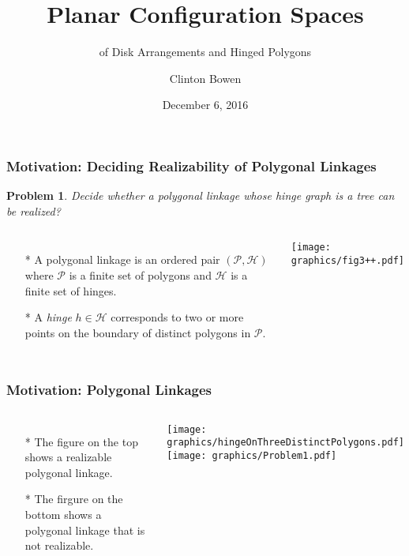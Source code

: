 \documentclass{beamer}
\title[Planar Configuration Spaces]{Planar Configuration Spaces }
\subtitle{of Disk Arrangements and Hinged Polygons}
\author{Clinton Bowen}
\institute
{
  Cal State Northridge
}
\date
{December 6, 2016}
\newtheorem{prob}{Problem}
\newcommand{\HH}{{\mathcal{H}}} %
\renewcommand{\PP}{{\mathcal{P}}} %
\begin{document}
\frame{\titlepage}
\begin{frame}\frametitle{Motivation: Deciding Realizability of Polygonal Linkages}
	\begin{prob}
	Decide whether a polygonal linkage whose hinge graph is a \textit{tree} can be realized?
	\end{prob}
	\begin{columns}[c] %
   \begin{itemize}
            \item[*]  A polygonal linkage is an ordered pair $\left(\PP,\HH \right)$ where $\PP$ is a finite set of polygons and $\HH$ is a finite set of hinges.
            \item[*]  A \textit{hinge} $h\in \HH$ corresponds to two or more points on the boundary of distinct polygons in $\PP$. 
    \end{itemize}
	\begin{minipage}{\linewidth}
        \begin{center}
            \texttt{[image: graphics/fig3++.pdf]}
        \end{center} 
    \end{minipage}
    \end{columns}
\end{frame}

\begin{frame}\frametitle{Motivation: Polygonal Linkages}
    \begin{columns}[c]
        \begin{itemize}
        	\item[*] The figure on the top shows a realizable polygonal linkage.
        	\item[*] The firgure on the bottom shows a polygonal linkage that is not realizable.
    	\end{itemize}
        \begin{minipage}{\linewidth}
            \begin{center}
            \texttt{[image: graphics/hingeOnThreeDistinctPolygons.pdf]}\vspace{.25in}
            \texttt{[image: graphics/Problem1.pdf]}
            \end{center}
        \end{minipage}
    \end{columns}
\end{frame}
\end{document}
